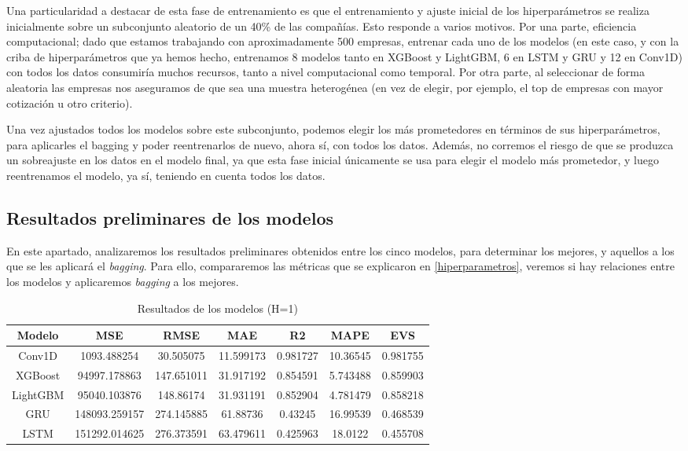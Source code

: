 \documentclass[a4paper,onecolumn]{extarticle}
\begin{document}
\begin{sloppypar}
Una particularidad a destacar de esta fase de entrenamiento es que el entrenamiento y ajuste inicial de los hiperparámetros se realiza inicialmente sobre un subconjunto aleatorio 
de un 40\% de las compañías. Esto responde a varios motivos. Por una parte, eficiencia computacional; dado que estamos trabajando con aproximadamente 500 empresas, entrenar cada uno 
de los modelos (en este caso, y con la criba de hiperparámetros que ya hemos hecho, entrenamos 8 modelos tanto en XGBoost y LightGBM, 6 en LSTM y GRU y 12 en Conv1D) con 
todos los datos consumiría muchos recursos, tanto a nivel computacional como temporal. Por otra parte, al seleccionar de forma aleatoria las empresas nos aseguramos de que sea 
una muestra heterogénea (en vez de elegir, por ejemplo, el top de empresas con mayor cotización u otro criterio).

Una vez ajustados todos los modelos sobre este subconjunto, podemos elegir los más prometedores en términos de sus hiperparámetros, para aplicarles el bagging y poder reentrenarlos 
de nuevo, ahora sí, con todos los datos. Además, no corremos el riesgo de que se produzca un sobreajuste en los datos en el modelo final, ya que esta fase inicial únicamente se usa para 
elegir el modelo más prometedor, y luego reentrenamos el modelo, ya sí, teniendo en cuenta todos los datos.

\subsection{Resultados preliminares de los modelos} \label{resultadosPreliminares}
En este apartado, analizaremos los resultados preliminares obtenidos entre los cinco modelos, para determinar los mejores, y aquellos a los que se les aplicará el \textit{bagging}.
Para ello, compararemos las métricas que se explicaron en \ref{hiperparametros}, veremos si hay relaciones entre los modelos y aplicaremos \textit{bagging} a los mejores.

\begin{table}[h!]
\centering
\begin{tabular}{|c|c|c|c|c|c|c|}
\hline
\textbf{Modelo} & \textbf{MSE} & \textbf{RMSE} & \textbf{MAE} & \textbf{R2} & \textbf{MAPE} & \textbf{EVS} \\
\hline
Conv1D   &   1093.488254 &   30.505075 & 11.599173 & 0.981727 & 10.36545  & 0.981755 \\
XGBoost  &  94997.178863 &  147.651011 & 31.917192 & 0.854591 &  5.743488 & 0.859903 \\
LightGBM &  95040.103876 &  148.86174  & 31.931191 & 0.852904 &  4.781479 & 0.858218 \\
GRU      & 148093.259157 &  274.145885 & 61.88736  & 0.43245  & 16.99539  & 0.468539 \\
LSTM     & 151292.014625 &  276.373591 & 63.479611 & 0.425963 & 18.0122   & 0.455708 \\
\hline
\end{tabular}
\caption{Resultados de los modelos (H=1)} \label{cuadro:H1}
\end{table}


\end{sloppypar}
\end{document}

